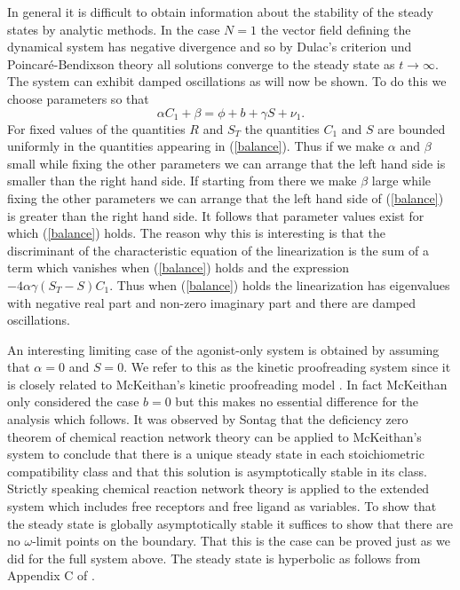 \documentclass{article}
\begin{document}
In general it is difficult to obtain information about the stability of the 
steady states by analytic methods. In the case $N=1$ the vector field 
defining the dynamical system has negative divergence and so by Dulac's 
criterion und Poincar\'e-Bendixson theory all solutions converge to the 
steady state as $t\to\infty$. The system can exhibit damped 
oscillations as will now be shown. To do this we choose 
parameters so that 
\begin{equation}\label{balance}
\alpha C_1+\beta=\phi+b+\gamma S+\nu_1.
\end{equation}
For fixed values of the quantities $R$ and $S_T$ the quantities $C_1$ and $S$
are bounded uniformly in the quantities appearing in (\ref{balance}). Thus 
if we make $\alpha$ and $\beta$ small while fixing the other parameters we can 
arrange that the left hand side is smaller than the right hand side. If 
starting from there we make $\beta$ large while fixing the other parameters
we can arrange that the left hand side of (\ref{balance}) is 
greater than the right hand side. It follows that parameter values exist for 
which (\ref{balance}) holds. The reason why this is interesting is that the 
discriminant of the characteristic equation of the linearization is the 
sum of a term which vanishes when (\ref{balance}) holds and the expression
$-4\alpha\gamma (S_T-S)C_1$. Thus when (\ref{balance}) holds the linearization
has eigenvalues with negative real part and non-zero imaginary part and there
are damped oscillations.

An interesting limiting case of the agonist-only system is obtained by assuming
that $\alpha=0$ and $S=0$. We refer to this as the kinetic proofreading 
system since it is closely related to McKeithan's kinetic proofreading model
\cite{mckeithan95}. In fact McKeithan only considered the case $b=0$ but 
this makes no essential difference for the analysis which follows. It was
observed by Sontag \cite{sontag01} that the deficiency zero theorem of chemical
reaction network theory can be applied to McKeithan's system to conclude that
there is a unique steady state in each stoichiometric compatibility
class and that this solution is asymptotically stable in its class. Strictly 
speaking chemical reaction network theory is applied to the extended system 
which includes free receptors and free ligand as variables. To show that the 
steady state is globally asymptotically stable it suffices to show that 
there are no $\omega$-limit points on the boundary. That this is the case can 
be proved just as we did for the full system above. The steady state is 
hyperbolic as follows from Appendix C of \cite{feinberg95a}.
\end{document}
